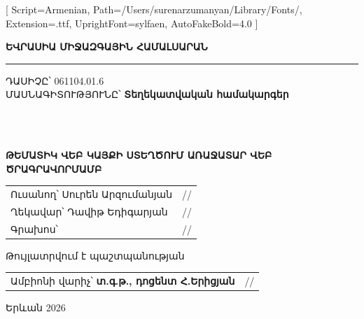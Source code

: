 \begin{titlepage}
\thispagestyle{empty}
\begingroup
{}
\newfontfamily{}[
  Script=Armenian,
  Path=/Users/surenarzumanyan/Library/Fonts/,
  Extension=.ttf,
  UprightFont=sylfaen,
  AutoFakeBold=4.0
]
\newcommand{\titleheavy}[1]{{\titleheavyfont\bfseries #1}}

\begin{center}
{\fontsize{18}{22}\selectfont\bfseries ԵՎՐԱՍԻԱ ՄԻՋԱԶԳԱՅԻՆ ՀԱՄԱԼՍԱՐԱՆ}
\end{center}
\vspace{-0.15cm}
\noindent\rule{\textwidth}{1.2pt}

\vspace{0.85cm}

\noindent ԴԱՍԻՉԸ՝ \hspace{0.25cm} 061104.01.6\\[0.7cm]
\noindent ՄԱՍՆԱԳԻՏՈՒԹՅՈՒՆԸ՝ \hspace{0.25cm} \titleheavy{Տեղեկատվական համակարգեր}

\vspace{1.8cm}

\begin{center}
{\fontsize{14}{17}\selectfont\titleheavy{ԿԱՌԱՎԱՐՄԱՆ ԵՎ ՏՀ ԱՄԲԻՈՆ}}\\[0.85cm]

{\fontsize{14}{17}\selectfont\titleheavy{Ավարտական աշխատանք}}\\[0.85cm]

\begin{minipage}{0.86\textwidth}
\centering
\titleheavy{ԹԵՄԱՏԻԿ ՎԵԲ ԿԱՅՔԻ ՍՏԵՂԾՈՒՄ ԱՌԱՋԱՏԱՐ ՎԵԲ ԾՐԱԳՐԱՎՈՐՄԱՄԲ}
\end{minipage}
\end{center}

\vspace{2.35cm}

\noindent
\begin{tabular}{@{}p{10.0cm}p{4.2cm}@{}}
Ուսանող՝ \hspace{0.25cm} Սուրեն Արզումանյան & /\hrulefill/\\[0.55cm]
Ղեկավար՝ \hspace{0.25cm} Դավիթ Եդիգարյան & /\hrulefill/\\[0.55cm]
Գրախոս՝ & /\hrulefill/\\[0.55cm]
\end{tabular}

\noindent Թույլատրվում է պաշտպանության\\[0.5cm]
\noindent
\begin{tabular}{@{}p{10.0cm}p{4.2cm}@{}}
Ամբիոնի վարիչ՝ \titleheavy{տ.գ.թ., դոցենտ Հ.Երիցյան} & /\hrulefill/\\
\end{tabular}

\vfill

\begin{center}
Երևան 2026
\end{center}

\endgroup
\end{titlepage}
